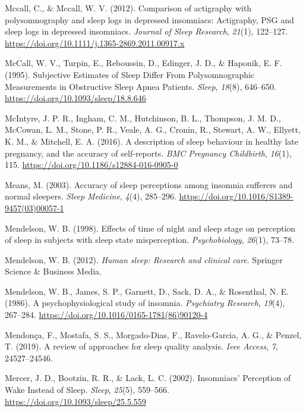 \documentclass[
]{article}
\newlength{\cslhangindent}
\newenvironment{CSLReferences}[2] %
 {\begin{list}{}{%
  \setlength{\itemindent}{0pt}
  \setlength{\leftmargin}{0pt}
  \setlength{\parsep}{0pt}
  \ifodd #1
   \setlength{\leftmargin}{\cslhangindent}
   \setlength{\itemindent}{-1\cslhangindent}
  \fi
  \setlength{\itemsep}{#2\baselineskip}}}
 {\end{list}}
\begin{document}
\begin{CSLReferences}{1}{0}
Mccall, C., \& Mccall, W. V. (2012). Comparison of actigraphy with polysomnography and sleep logs in depressed insomniacs: {Actigraphy}, {PSG} and sleep logs in depressed insomniacs. \emph{Journal of Sleep Research}, \emph{21}(1), 122--127. \url{https://doi.org/10.1111/j.1365-2869.2011.00917.x}

McCall, W. V., Turpin, E., Reboussin, D., Edinger, J. D., \& Haponik, E. F. (1995). Subjective {Estimates} of {Sleep} {Differ} {From} {Polysomnographic} {Measurements} in {Obstructive} {Sleep} {Apnea} {Patients}. \emph{Sleep}, \emph{18}(8), 646--650. \url{https://doi.org/10.1093/sleep/18.8.646}

McIntyre, J. P. R., Ingham, C. M., Hutchinson, B. L., Thompson, J. M. D., McCowan, L. M., Stone, P. R., Veale, A. G., Cronin, R., Stewart, A. W., Ellyett, K. M., \& Mitchell, E. A. (2016). A description of sleep behaviour in healthy late pregnancy, and the accuracy of self-reports. \emph{BMC Pregnancy Childbirth}, \emph{16}(1), 115. \url{https://doi.org/10.1186/s12884-016-0905-0}

Means, M. (2003). Accuracy of sleep perceptions among insomnia sufferers and normal sleepers. \emph{Sleep Medicine}, \emph{4}(4), 285--296. \url{https://doi.org/10.1016/S1389-9457(03)00057-1}

Mendelson, W. B. (1998). Effects of time of night and sleep stage on perception of sleep in subjects with sleep state misperception. \emph{Psychobiology}, \emph{26}(1), 73--78.

Mendelson, W. B. (2012). \emph{Human sleep: Research and clinical care}. Springer Science \& Business Media.

Mendelson, W. B., James, S. P., Garnett, D., Sack, D. A., \& Rosenthal, N. E. (1986). A psychophysiological study of insomnia. \emph{Psychiatry Research}, \emph{19}(4), 267--284. \url{https://doi.org/10.1016/0165-1781(86)90120-4}

Mendonça, F., Mostafa, S. S., Morgado-Dias, F., Ravelo-Garcia, A. G., \& Penzel, T. (2019). A review of approaches for sleep quality analysis. \emph{Ieee Access}, \emph{7}, 24527--24546.

Mercer, J. D., Bootzin, R. R., \& Lack, L. C. (2002). Insomniacs' {Perception} of {Wake} {Instead} of {Sleep}. \emph{Sleep}, \emph{25}(5), 559--566. \url{https://doi.org/10.1093/sleep/25.5.559}


\end{CSLReferences}
\end{document}
